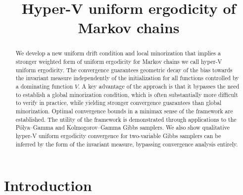 \documentclass[ejsv2, noshowframe]{imsart}
\theoremstyle{plain}
\theoremstyle{definition}
\theoremstyle{remark}
\begin{document}
\begin{frontmatter}
\title{Hyper-V uniform ergodicity of Markov chains}


\begin{abstract}
We develop a new uniform drift condition and local minorization that implies a stronger weighted form of uniform ergodicity for Markov chains we call hyper-V uniform ergodicity. The convergence guarantees geometric decay of the bias towards the invariant measure independently of the initialization for all functions controlled by a dominating function $V$. A key advantage of the approach is that it bypasses the need to establish a global minorization condition, which is often substantially more difficult to verify in practice, while yielding stronger convergence guarantees than global minorization. 
Optimal convergence bounds in a minimax sense of the framework are established.
The utility of the framework is demonstrated through applications to the P\'olya--Gamma and Kolmogorov--Gamma Gibbs samplers. We also show qualitative hyper-V uniform ergodicity convergence for two-variable Gibbs samplers can be inferred by the form of the invariant measure, bypassing convergence analysis entirely.
\end{abstract}

\begin{keyword}[class=MSC]
\end{keyword}

\begin{keyword}
\end{keyword}

\end{frontmatter}

\section{Introduction}
\end{document}
